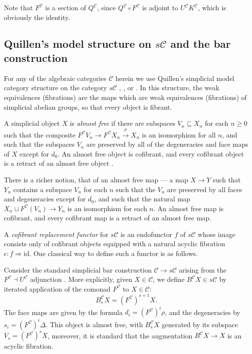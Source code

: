 \documentclass[11pt]{amsart} \renewcommand{\baselinestretch}{1.4}
\theoremstyle{plain}
\theoremstyle{definition}
\renewcommand{\to}{\longrightarrow}
\newcommand{\calc}{\mathcal{C}}
\newcommand{\citeBOX}[2][]{\cite[\mbox{#1}]{#2}}
\newcommand{\Id}{\mathrm{id}}
\begin{document}
\begin{Conventions and notation}
Note that $F^\calc$ is a section of $Q^{\calc}$, since $Q^{\calc}\circ F^{\calc}$ is adjoint to $U^\calc K^\calc$, which is obviously the identity.

\subsection{Quillen's model structure on $s\calc$ and the bar construction}\label{ssec: quillen model and bar construction}
For any of the algebraic categories $\calc$ herein we use Quillen's simplicial model category structure on the category $s\calc$ \cite{QuillenHomAlg.pdf}, \cite{MillerSullivanConjecture.pdf}, or \cite{Blanc_Stover-Groth_SS.pdf}. In this structure, the weak equivalences (fibrations) are the maps which are weak equivalences (fibrations) of simplicial abelian groups, so that every object is fibrant. 

 A simplicial object $X$ is \emph{almost free} if there are subspaces $V_n\subseteq X_n$ for each $n\geq0$ such that the composite $F^\calc  V_n\to F^\calc  X_n\overset{\rho}{\to} X_n$ is an isomorphism for all $n$, and such that the subspaces $V_n$ are preserved by all of the degeneracies and face maps of $X$ except for $d_0$. An almost free object is cofibrant, and every cofibrant object is a retract of an almost free object \citeBOX[\S3]{MillerSullivanConjecture.pdf}. 

There is a richer notion, that of an almost free map --- a map $X\to Y$ such that $Y_n$ contains a subspace $V_n$ for each $n$ such that the $V_n$ are preserved by all faces and degeneracies except for $d_0$, and such that the natural map $X_n\sqcup F^\calc(V_n) \to Y_n$ is an isomorphism for each $n$. An almost free map is cofibrant, and every cofibrant map is a retract of an almost free map.

A \emph{cofibrant replacement functor} for $s\calc$  is an endofunctor $f$ of $s\calc$ whose image consists only of cofibrant objects equipped with  a natural acyclic fibration $\epsilon:f\Rightarrow \Id $. One classical way to define such a functor is as follows.

Consider the standard simplicial bar construction $\calc\to s\calc$ arising from the $F^\calc\dashv U^\calc$ adjunction \cite{BlumRiehlResolutions.pdf}. More explicitly, given $X\in\calc$, we define $B^\calc X\in s\calc$ by iterated application of the comonad $F^\calc$ to $X\in \calc$:
\[B_s^\calc X=(F^\calc)^{s+1}X.\]
The face maps are given by the formula $d_i=(F^\calc)^i\rho$, and the degeneracies by $s_i=(F^\calc)^i\Delta$. %
This object is almost free, with $B_s^\calc X$ generated by its subspace $V_s=(F^\calc )^sX$, moreover, it is standard \citeBOX[\S4]{BlumRiehlResolutions.pdf} that the augmentation $B^\calc X\to X$ is an acyclic fibration.


\end{Conventions and notation}
\end{document}
